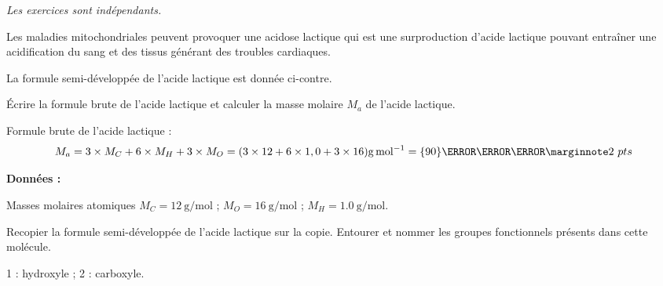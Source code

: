\vAligne{-50pt}

\textit{Les exercices sont indépendants.}
\medskip

\medskip

\begin{wrapfigure}{r}{0.2\linewidth}
  \vspace*{-20pt}
  \centering
\end{wrapfigure}
Les maladies mitochondriales peuvent provoquer une acidose lactique qui est une surproduction d’acide lactique pouvant entraîner une acidification du sang et des tissus générant des troubles cardiaques.  

La formule semi-développée de l’acide lactique est donnée ci-contre. 
 
\numeroQuestion Écrire la formule brute de l'acide lactique et calculer la masse molaire $M_a$ de l'acide lactique.

\begin{encart}
  Formule brute de l'acide lactique :  
  \begin{equation*}  
    M_a = 3\times M_C + 6\times M_H + 3\times M_O
    = (3\times 12 + 6\times 1,0 + 3\times 16)\unit{\g\per\mole}
    = \qty{90}{\g\per\mole}
    \points{2}
  \end{equation*}
\end{encart}

\medskip
\textbf{Données :} 

Masses molaires atomiques 
$M_C = \qty{12}{\g\per\mole}$ ;
$M_O = \qty{16}{\g\per\mole}$ ;
$M_H = \qty{1,0}{\g\per\mole}$.
\medskip

\numeroQuestion Recopier la formule semi-développée de l’acide lactique sur la copie.
Entourer et nommer les groupes fonctionnels présents dans cette molécule.


\begin{encart}
  \begin{center}
  \end{center}

  1 : hydroxyle ;
  2 : carboxyle.
\end{encart}


